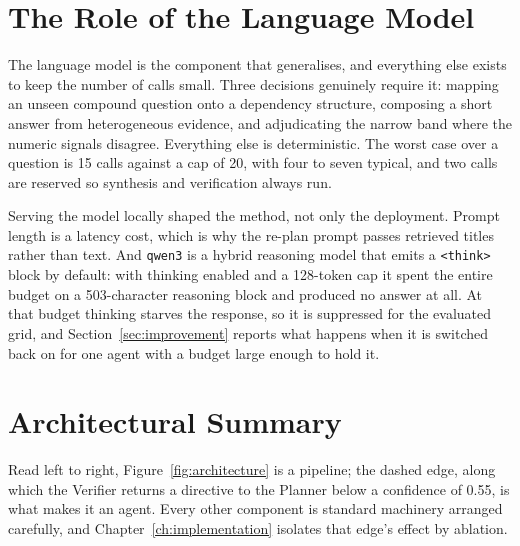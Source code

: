 \section{The Role of the Language Model}
\label{sec:llm-role}

The language model is the component that generalises, and everything else
exists to keep the number of calls small. Three decisions genuinely require it:
mapping an unseen compound question onto a dependency structure, composing a
short answer from heterogeneous evidence, and adjudicating the narrow band
where the numeric signals disagree. Everything else is deterministic. The
worst case over a question is 15 calls against a cap of 20, with four to seven
typical, and two calls are reserved so synthesis and verification always run.

Serving the model locally shaped the method, not only the deployment. Prompt
length is a latency cost, which is why the re-plan prompt passes retrieved
titles rather than text. And \texttt{qwen3} is a hybrid reasoning model that
emits a \texttt{<think>} block by default: with thinking enabled and a
128-token cap it spent the entire budget on a 503-character reasoning block
and produced no answer at all. At that budget thinking starves the response,
so it is suppressed for the evaluated grid, and Section~\ref{sec:improvement}
reports what happens when it is switched back on for one agent with a budget
large enough to hold it.

\section{Architectural Summary}
\label{sec:arch-summary}

Read left to right, Figure~\ref{fig:architecture} is a pipeline; the dashed
edge, along which the Verifier returns a directive to the Planner below a
confidence of 0.55, is what makes it an agent. Every other component is
standard machinery arranged carefully, and Chapter~\ref{ch:implementation}
isolates that edge's effect by ablation.
